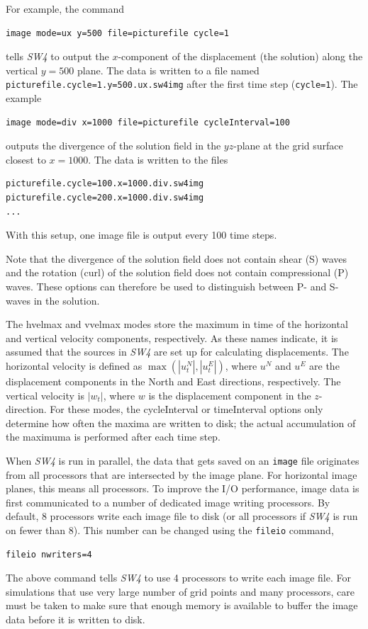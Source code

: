 \documentclass[11pt]{report}
\begin{document}
For example, the command
\begin{verbatim}
image mode=ux y=500 file=picturefile cycle=1
\end{verbatim}
tells \emph{SW4} to output the $x$-component of the displacement (the solution) along the vertical
$y=500$ plane.  The data is written to a file named {\tt picturefile.cycle=1.y=500.ux.sw4img} after
the first time step ({\tt cycle=1}). The example
\begin{verbatim}
image mode=div x=1000 file=picturefile cycleInterval=100
\end{verbatim}
outputs the divergence of the solution field in the $yz$-plane at the grid surface closest to
$x=1000$. The data is written to the files
\begin{verbatim} 
picturefile.cycle=100.x=1000.div.sw4img
picturefile.cycle=200.x=1000.div.sw4img
...
\end{verbatim}
With this setup, one image file is output every 100 time steps.

Note that the divergence of the solution field does not contain shear (S) waves and the
rotation (curl) of the solution field does not contain compressional (P) waves. These
options can therefore be used to distinguish between P- and S-waves in the solution.

The hvelmax and vvelmax modes store the maximum in time of the horizontal and vertical velocity
components, respectively. As these names indicate, it is assumed that the sources in \emph{SW4} are
set up for calculating displacements. The horizontal velocity is defined as $\max(|u^N_t|,|u^E_t|)$,
where $u^N$ and $u^E$ are the displacement components in the North and East directions,
respectively. The vertical velocity is $|w_t|$, where $w$ is the displacement component in the
$z$-direction. For these modes, the cycleInterval or timeInterval options only determine how often
the maxima are written to disk; the actual accumulation of the maximuma is performed after each time
step.

When \emph{SW4} is run in parallel, the data that gets saved on an {\tt image} file originates from
all processors that are intersected by the image plane. For horizontal image planes, this means all
processors. To improve the I/O performance, image data is first communicated to a number of
dedicated image writing processors. By default, 8 processors write each image file to disk (or all
processors if \emph{SW4} is run on fewer than 8). This number can be changed using the {\tt fileio}
command,
\begin{verbatim}
fileio nwriters=4
\end{verbatim}
The above command tells \emph{SW4} to use 4 processors to write each image file. For simulations
that use very large number of grid points and many processors, care must be taken to make sure that
enough memory is available to buffer the image data before it is written to disk.
\end{document}
